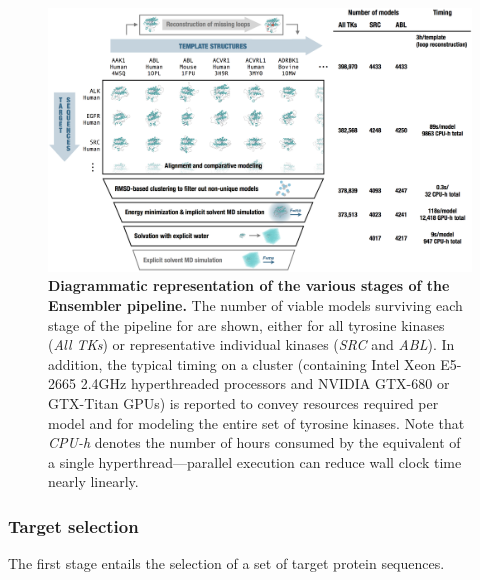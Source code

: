 \documentclass[aps,pre,twocolumn,nofootinbib,superscriptaddress,linenumbers]{revtex4-1}
\begin{document}
\begin{figure}[tb]
  \centering
    \includegraphics[width=1.0\textwidth]{pipeline/pipeline2}
  \caption{{\bf Diagrammatic representation of the various stages of the Ensembler pipeline.}
  The number of viable models surviving each stage of the pipeline for are shown, either for all tyrosine kinases (\emph{All TKs}) or representative individual kinases (\emph{SRC} and \emph{ABL}).
  In addition, the typical timing on a cluster (containing Intel Xeon E5-2665 2.4GHz hyperthreaded processors and NVIDIA GTX-680 or GTX-Titan GPUs) is reported to convey resources required per model and for modeling the entire set of tyrosine kinases.
  Note that \emph{CPU-h} denotes the number of hours consumed by the equivalent of a single hyperthread---parallel execution can reduce wall clock time nearly linearly.
  }
  \label{figpipeline}
\end{figure}

\subsubsection{Target selection}

The first stage entails the selection of a set of target protein sequences.
\end{document}
